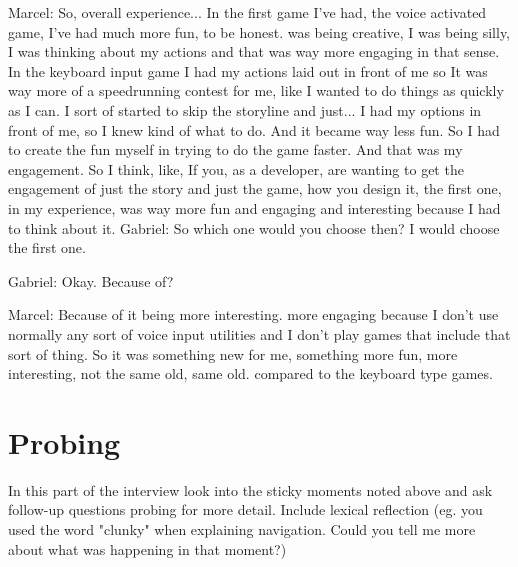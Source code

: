 \begin{QandA}
         \begin{answered}
            Marcel: So, overall experience...
             In the first game I've had, the voice activated game, I've had much more fun, to be honest.
             was being creative, I was being silly, I was thinking about my actions and that was way more engaging in that sense.
            In the keyboard input game I had my actions laid out in front of me so
            It was way more of a speedrunning contest for me, like I wanted to do things as quickly as I can.
            I sort of started to skip the storyline and just...
            I had my options in front of me, so I knew kind of what to do.
            And it became way less fun.
            So I had to create the fun myself in trying to do the game faster.
            And that was my engagement.
            So I think, like,
            If you, as a developer, are wanting to get the engagement of just the story and just the game, how you design it, the first one, in my experience, was way more fun and engaging and interesting because I had to think about it.
            Gabriel: So which one would you choose then?
            I would choose the first one.


            Gabriel: Okay.
            Because of?


            Marcel: Because of it being more interesting.
            more engaging because I don't use normally any sort of voice input utilities and I don't play games that include that sort of thing.
            So it was something new for me, something more fun, more interesting, not the same old, same old.
            compared to the keyboard type games.
            

            
         \end{answered}
\end{QandA}






\section{Probing}
In this part of the interview look into the sticky moments noted above and ask follow-up questions probing for more detail.
Include lexical reflection (eg. you used the word "clunky" when explaining navigation. Could you tell me more about what was happening
in that moment?)



